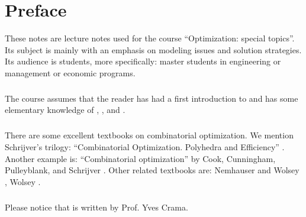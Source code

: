 \chapter*{Preface}
These notes are lecture notes used for the course ``Optimization: special topics''. Its subject is mainly  with an emphasis on modeling issues and solution strategies. Its audience is students, more specifically: master students in engineering or management or economic programs.

\paragraph{}
The course assumes that the reader has had a first introduction to  and has some elementary knowledge of , , and .

\paragraph{}
There are some excellent textbooks on combinatorial optimization. We mention Schrijver's trilogy: ``Combinatorial Optimization. Polyhedra and Efficiency'' \cite{schrijver-book}. Another example is: ``Combinatorial optimization'' by Cook, Cunningham, Pulleyblank, and Schrijver \cite{Cook:98}. Other related textbooks are: Nemhauser and Wolsey \cite{citeulike:2212037}, Wolsey \cite{wolseyip}.

\paragraph{}
Please notice that  is written by Prof. Yves Crama.